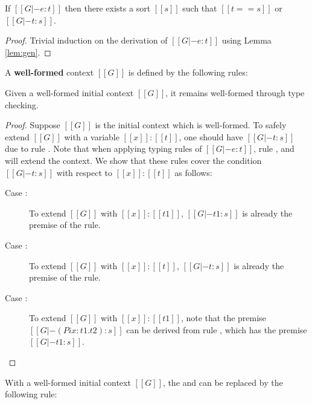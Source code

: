 \begin{lem}\label{lem:corrtyp}
    If $[[G |- e:t]]$ then there exists a sort $[[s]]$ such that $[[t == s]]$ or $[[G |- t : s]]$.
\end{lem}

\begin{proof}
    Trivial induction on the derivation of $[[G |- e:t]]$ using Lemma \ref{lem:gen}.
\end{proof}

\begin{dfn}
	A \textbf{well-formed} context $[[G]]$ is defined by the following rules:
	
	\textnormal{\ottdefnctx{}}
\end{dfn}

\begin{lem}\label{lem:wfc}
	Given a well-formed initial context $[[G]]$, it remains well-formed through type checking.
\end{lem}

\begin{proof}
	Suppose $[[G]]$ is the initial context which is well-formed. To safely extend $[[G]]$ with a variable $[[x]]:[[t]]$, one should have $[[G |- t:s]]$ due to rule . Note that when applying typing rules of $[[G |- e:t]]$, rule ,  and  will extend the context. We show that these rules cover the condition $[[G |- t:s]]$ with respect to $[[x]]:[[t]]$ as follows:
	\begin{description}
		\item[Case :] To extend $[[G]]$ with $[[x]]:[[t1]]$, $[[G |- t1:s]]$ is already the premise of the rule.
		\item[Case :] To extend $[[G]]$ with $[[x]]:[[t]]$, $[[G |- t:s]]$ is already the premise of the rule.
		\item[Case :] To extend $[[G]]$ with $[[x]]:[[t1]]$, note that the premise $[[G |- (Pi x:t1.t2):s]]$ can be derived from rule , which has the premise $[[G |- t1:s]]$.
	\end{description}
\end{proof}

\begin{lem}\label{lem:wfcopt}
	With a well-formed initial context $[[G]]$, the  and  can be replaced by the following rule: \ottusedrule{\ottdruleTXXVarEnv{}}
\end{lem}

